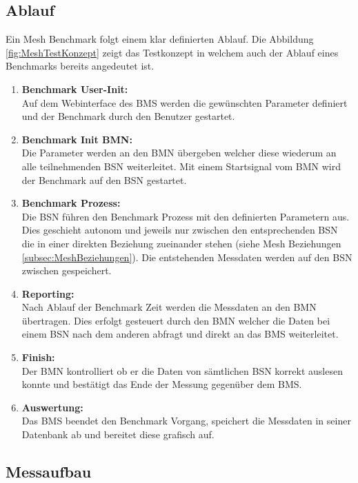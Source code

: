 \subsection{Ablauf}\label{subsec:AblaufMesh}

Ein Mesh Benchmark folgt einem klar definierten Ablauf. Die Abbildung \ref{fig:MeshTestKonzept} zeigt das Testkonzept in welchem auch der Ablauf eines Benchmarks bereits angedeutet ist.

\begin{enumerate}
	\item \textbf{Benchmark User-Init:}\\
	Auf dem Webinterface des BMS werden die gewünschten Parameter definiert und der Benchmark durch den Benutzer gestartet.
	\item \textbf{Benchmark Init BMN:}\\
	Die Parameter werden an den BMN übergeben welcher diese wiederum an alle teilnehmenden BSN weiterleitet. Mit einem Startsignal vom BMN wird der Benchmark auf den BSN gestartet.
	\item \textbf{Benchmark Prozess:}\\
	Die BSN führen den Benchmark Prozess mit den definierten Parametern aus. Dies geschieht autonom und jeweils nur zwischen den entsprechenden BSN die in einer direkten Beziehung zueinander stehen (siehe Mesh Beziehungen \ref{subsec:MeshBeziehungen}). Die entstehenden Messdaten werden auf den BSN zwischen gespeichert.
	\item \textbf{Reporting:}\\
	Nach Ablauf der Benchmark Zeit werden die Messdaten an den BMN übertragen. Dies erfolgt gesteuert durch den BMN welcher die Daten bei einem BSN nach dem anderen abfragt und direkt an das BMS weiterleitet.
	\item \textbf{Finish:}\\
	Der BMN kontrolliert ob er die Daten von sämtlichen BSN korrekt auslesen konnte und bestätigt das Ende der Messung gegenüber dem BMS.
	\item \textbf{Auswertung:}\\
	Das BMS beendet den Benchmark Vorgang, speichert die Messdaten in seiner Datenbank ab und bereitet diese grafisch auf. 
\end{enumerate}

\subsection{Messaufbau}\label{subsec:Messaufbau}

